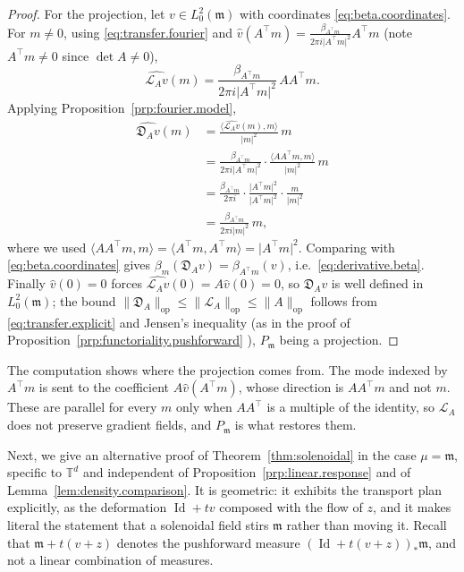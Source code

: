 \documentclass[11pt,reqno]{amsart}
\theoremstyle{plain}
\theoremstyle{definition}
\newcommand{\T}{\mathbb{T}}
\newcommand{\Leb}{\mathfrak{m}}
\newcommand{\D}{\mathfrak{D}}
\newcommand{\Transf}{\mathcal{L}}
\DeclareMathOperator{\Id}{Id}
\begin{document}
\begin{proof}
    For the projection, let \( v\in L^2_0(\Leb) \) with coordinates \eqref{eq:beta.coordinates}.
    For \( m\neq0 \), using \eqref{eq:transfer.fourier} and \( \hat v(A^{\top}m)=\frac{\beta_{A^{\top}m}}{2\pi i\lvert A^{\top}m \rvert^2}A^{\top}m \) (note \( A^{\top}m\neq0 \) since \( \det A\neq0 \)),
    \[
        \widehat{\Transf_A v}(m)=\frac{\beta_{A^{\top}m}}{2\pi i\lvert A^{\top}m \rvert^{2}}\,AA^{\top}m .
    \]
    Applying Proposition~\ref{prp:fourier.model},
    \[
        \begin{split}
            \widehat{\D_Av}(m)
             & =\frac{\langle \widehat{\Transf_A v}(m),m\rangle}{\lvert m \rvert^{2}}\,m                    \\
             & =\frac{\beta_{A^{\top}m}}{2\pi i\lvert A^{\top}m \rvert^{2}}\cdot
            \frac{\langle AA^{\top}m,m\rangle}{\lvert m \rvert^{2}}\,m                                        \\
             & =\frac{\beta_{A^{\top}m}}{2\pi i}\cdot\frac{\lvert A^{\top}m \rvert^{2}}{\lvert A^{\top}m \rvert^{2}}\cdot
            \frac{m}{\lvert m \rvert^{2}}                                                                     \\
             & =\frac{\beta_{A^{\top}m}}{2\pi i\lvert m \rvert^{2}}\,m,
        \end{split}
    \]
    where we used \( \langle AA^{\top}m,m\rangle=\langle A^{\top}m,A^{\top}m\rangle=\lvert A^{\top}m \rvert^2 \).
    Comparing with \eqref{eq:beta.coordinates} gives \( \beta_m(\D_Av)=\beta_{A^\top m}(v) \), i.e.\ \eqref{eq:derivative.beta}.
    Finally \( \hat v(0)=0 \) forces \( \widehat{\Transf_A v}(0)=A\hat v(0)=0 \), so \( \D_Av \) is well defined in \( L^2_0(\Leb) \); the bound \( \lVert \D_A \rVert_{\mathrm{op}}\le\lVert \Transf_A \rVert_{\mathrm{op}}\le\lVert A \rVert_{\mathrm{op}} \) follows from \eqref{eq:transfer.explicit} and Jensen's inequality (as in the proof of Proposition~\ref{prp:functoriality.pushforward} ), \( P_\Leb \) being a projection.
\end{proof}
The computation shows where the projection comes from. 
The mode indexed by \(A^\top m\) is sent to the coefficient \(A\hat v(A^\top m)\), whose direction is \(AA^\top m\) and not \(m\). 
These are parallel for every \(m\) only when \(AA^\top\) is a multiple of the identity, so \(\mathcal L_A\) does not preserve gradient fields, and \(P_\Leb\) is what restores them.

Next, we give an alternative proof of Theorem~\ref{thm:solenoidal} in the case \( \mu=\Leb \), specific to \( \T^d \) and independent of Proposition~\ref{prp:linear.response} and of Lemma~\ref{lem:density.comparison}.
It is geometric: it exhibits the transport plan explicitly, as the deformation \( \Id+tv \) composed with the flow of \( z \), and it makes literal the statement that a solenoidal field stirs \( \Leb \) rather than moving it.
Recall that \( \Leb+t(v+z) \) denotes the pushforward measure \( (\Id+t(v+z))_\ast\Leb \), and not a linear combination of measures.
\end{document}
